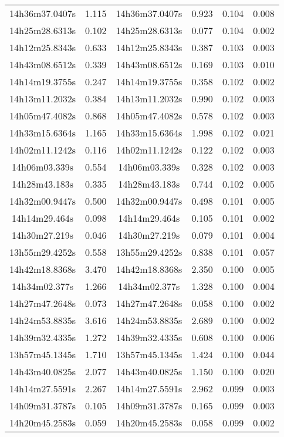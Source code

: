 \begin{table}
\begin{tabular}{cccccc}
14h36m37.0407s & 1.115 & 14h36m37.0407s & 0.923 & 0.104 & 0.008 \\
14h25m28.6313s & 0.102 & 14h25m28.6313s & 0.077 & 0.104 & 0.002 \\
14h12m25.8343s & 0.633 & 14h12m25.8343s & 0.387 & 0.103 & 0.003 \\
14h43m08.6512s & 0.339 & 14h43m08.6512s & 0.169 & 0.103 & 0.010 \\
14h14m19.3755s & 0.247 & 14h14m19.3755s & 0.358 & 0.102 & 0.002 \\
14h13m11.2032s & 0.384 & 14h13m11.2032s & 0.990 & 0.102 & 0.003 \\
14h05m47.4082s & 0.868 & 14h05m47.4082s & 0.578 & 0.102 & 0.003 \\
14h33m15.6364s & 1.165 & 14h33m15.6364s & 1.998 & 0.102 & 0.021 \\
14h02m11.1242s & 0.116 & 14h02m11.1242s & 0.122 & 0.102 & 0.003 \\
14h06m03.339s & 0.554 & 14h06m03.339s & 0.328 & 0.102 & 0.003 \\
14h28m43.183s & 0.335 & 14h28m43.183s & 0.744 & 0.102 & 0.005 \\
14h32m00.9447s & 0.500 & 14h32m00.9447s & 0.498 & 0.101 & 0.005 \\
14h14m29.464s & 0.098 & 14h14m29.464s & 0.105 & 0.101 & 0.002 \\
14h30m27.219s & 0.046 & 14h30m27.219s & 0.079 & 0.101 & 0.004 \\
13h55m29.4252s & 0.558 & 13h55m29.4252s & 0.838 & 0.101 & 0.057 \\
14h42m18.8368s & 3.470 & 14h42m18.8368s & 2.350 & 0.100 & 0.005 \\
14h34m02.377s & 1.266 & 14h34m02.377s & 1.328 & 0.100 & 0.004 \\
14h27m47.2648s & 0.073 & 14h27m47.2648s & 0.058 & 0.100 & 0.002 \\
14h24m53.8835s & 3.616 & 14h24m53.8835s & 2.689 & 0.100 & 0.002 \\
14h39m32.4335s & 1.272 & 14h39m32.4335s & 0.608 & 0.100 & 0.006 \\
13h57m45.1345s & 1.710 & 13h57m45.1345s & 1.424 & 0.100 & 0.044 \\
14h43m40.0825s & 2.077 & 14h43m40.0825s & 1.150 & 0.100 & 0.020 \\
14h14m27.5591s & 2.267 & 14h14m27.5591s & 2.962 & 0.099 & 0.003 \\
14h09m31.3787s & 0.105 & 14h09m31.3787s & 0.165 & 0.099 & 0.003 \\
14h20m45.2583s & 0.059 & 14h20m45.2583s & 0.058 & 0.099 & 0.002 \\

\end{tabular}
\end{table}
